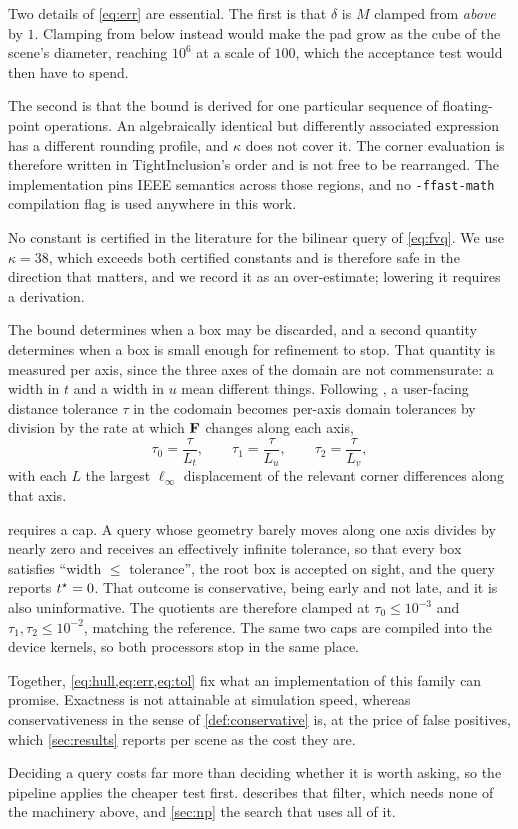 Two details of \cref{eq:err} are essential. The first is that $\delta$ is $M$
clamped from \emph{above} by $1$. Clamping from below instead would make the pad
grow as the cube of the scene's diameter, reaching $10^{6}$ at a scale of $100$,
which the acceptance test would then have to spend.

The second is that the bound is derived for one particular sequence of
floating-point operations. An algebraically identical but differently associated
expression has a different rounding profile, and $\kappa$ does not cover it. The
corner evaluation is therefore written in TightInclusion's order and is not free
to be rearranged. The implementation pins IEEE semantics across those regions,
and no \texttt{-ffast-math} compilation flag is used anywhere in this work.

No constant is certified in the literature for the bilinear query of
\cref{eq:fvq}. We use $\kappa = 38$, which exceeds both certified constants and
is therefore safe in the direction that matters, and we record it as an
over-estimate; lowering it requires a derivation.

The bound determines when a box may be discarded, and a second quantity
determines when a box is small enough for refinement to stop. That quantity is
measured per axis, since the three axes of the domain are not commensurate: a
width in $t$ and a width in $u$ mean different things. Following
\citet{wang2021tight}, a user-facing distance tolerance $\tau$ in the codomain
becomes per-axis domain tolerances by division by the rate at which $\mathbf{F}$
changes along each axis,
\begin{equation}
\label{eq:tol}
\tau_{0} = \frac{\tau}{L_{t}},\qquad
\tau_{1} = \frac{\tau}{L_{u}},\qquad
\tau_{2} = \frac{\tau}{L_{v}},
\end{equation}
with each $L$ the largest $\ell_{\infty}$ displacement of the relevant corner
differences along that axis.

 requires a cap. A query whose geometry barely moves along one axis
divides by nearly zero and receives an effectively infinite tolerance, so that
every box satisfies ``width $\le$ tolerance'', the root box is accepted on
sight, and the query reports $t^{\star} = 0$. That outcome is conservative, being
early and not late, and it is also uninformative. The quotients are therefore
clamped at $\tau_{0}\le 10^{-3}$ and $\tau_{1},\tau_{2}\le 10^{-2}$, matching
the reference. The same two caps are compiled into the device kernels, so both
processors stop in the same place.

Together, \cref{eq:hull,eq:err,eq:tol} fix what an implementation of this family
can promise. Exactness is not attainable at simulation speed, whereas
conservativeness in the sense of \cref{def:conservative} is, at the price of
false positives, which \cref{sec:results} reports per scene as the cost they
are.

Deciding a query costs far more than deciding whether it is worth asking, so the
pipeline applies the cheaper test first.  describes that filter,
which needs none of the machinery above, and \cref{sec:np} the search that uses
all of it.
